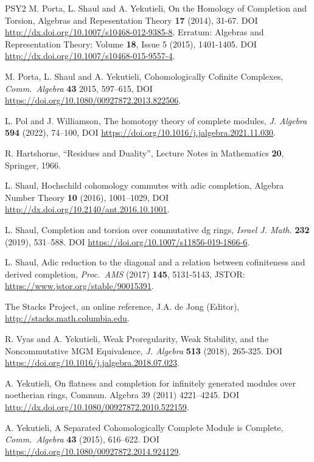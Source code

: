 \documentclass[10pt]{amsart}
\theoremstyle{definition}
\numberwithin{equation}{section}
\begin{document}
\begin{thebibliography}{PSY2}
 M. Porta, L. Shaul and A. Yekutieli,
On the Homology of Completion and Torsion,
Algebras and Repesentation Theory {\bf 17} (2014), 31-67.
DOI \url{http://dx.doi.org/10.1007/s10468-012-9385-8}.
Erratum: Algebras and Representation Theory: Volume {\bf 18}, Issue 5 (2015),
1401-1405.
DOI \url{http://dx.doi.org/10.1007/s10468-015-9557-4}.

 M. Porta, L. Shaul and A. Yekutieli,
Cohomologically Cofinite Complexes,
{\em Comm.\ Algebra} {\bf 43} 2015, 597–615,
DOI \url{https://doi.org/10.1080/00927872.2013.822506}.

 L. Pol and J. Williamson,
The homotopy theory of complete modules,
{\em J. Algebra} {\bf 594} (2022), 74–100,
DOI \url{https://doi.org/10.1016/j.jalgebra.2021.11.030}.

 R. Hartshorne,
``Residues and Duality'', Lecture Notes in Mathematics {\bf 20}, Springer,
1966.

 L. Shaul,
Hochschild cohomology commutes with adic completion,
Algebra Number Theory {\bf 10} (2016), 1001–1029,
DOI \url{http://dx.doi.org/10.2140/ant.2016.10.1001}.

 L. Shaul,
Completion and torsion over commutative dg rings,
{\em Israel J. Math.} {\bf 232} (2019), 531–588.
DOI \url{https://doi.org/10.1007/s11856-019-1866-6}.

 L. Shaul,
Adic reduction to the diagonal and a relation between cofiniteness and
derived completion,
{\em Proc.\ AMS} (2017) {\bf 145}, 5131-5143, JSTOR:
\url{https://www.jstor.org/stable/90015391}.

 The Stacks Project, an online reference, J.A. de Jong
(Editor), \url{http://stacks.math.columbia.edu}.

 R. Vyas and A. Yekutieli,
Weak Proregularity, Weak Stability, and the Noncommutative MGM Equivalence,
{\em J. Algebra} {\bf 513} (2018), 265-325.
DOI \url{https://doi.org/10.1016/j.jalgebra.2018.07.023}.

 A. Yekutieli, On flatness and completion for infinitely
generated modules over noetherian rings,
Commun. Algebra 39 (2011) 4221–4245.
DOI \url{http://dx.doi.org/10.1080/00927872.2010.522159}.

 A. Yekutieli,
A Separated Cohomologically Complete Module is Complete,
{\em Comm.\ Algebra} {\bf 43} (2015), 616–622.
DOI \url{https://doi.org/10.1080/00927872.2014.924129}.


\end{thebibliography}
\end{document}
